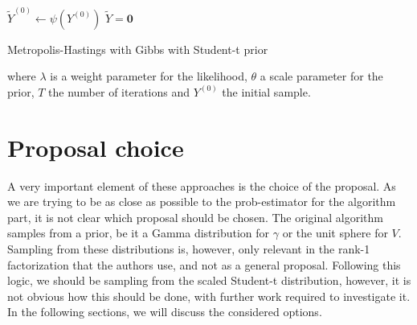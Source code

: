 \documentclass[12pt]{memoir}
\newcommand{\mb}{\mathbf}
\begin{document}
\begin{algorithm}[H]
    \DontPrintSemicolon

    $\tilde Y^{(0)} \gets \psi(Y^{(0)})$\;
    $\tilde Y = \mb 0$\;
    \caption{Metropolis-Hastings with Gibbs with Student-t prior}
\end{algorithm}\medbreak
where $\lambda$ is a weight parameter for the likelihood, $\theta$ a scale parameter for the prior, $T$ the number of iterations and $Y^{(0)}$ the initial sample.\medbreak

\section{Proposal choice}\label{section:proposal-choice}
A very important element of these approaches is the choice of the proposal. As we are trying to be as close as possible to the prob-estimator for the algorithm part, it is not clear which proposal should be chosen. The original algorithm samples from a prior, be it a Gamma distribution for $\gamma$ or the unit sphere for $V$. Sampling from these distributions is, however, only relevant in the rank-1 factorization that the authors use, and not as a general proposal. Following this logic, we should be sampling from the scaled Student-t distribution, however, it is not obvious how this should be done, with further work required to investigate it. In the following sections, we will discuss the considered options.
\end{document}
